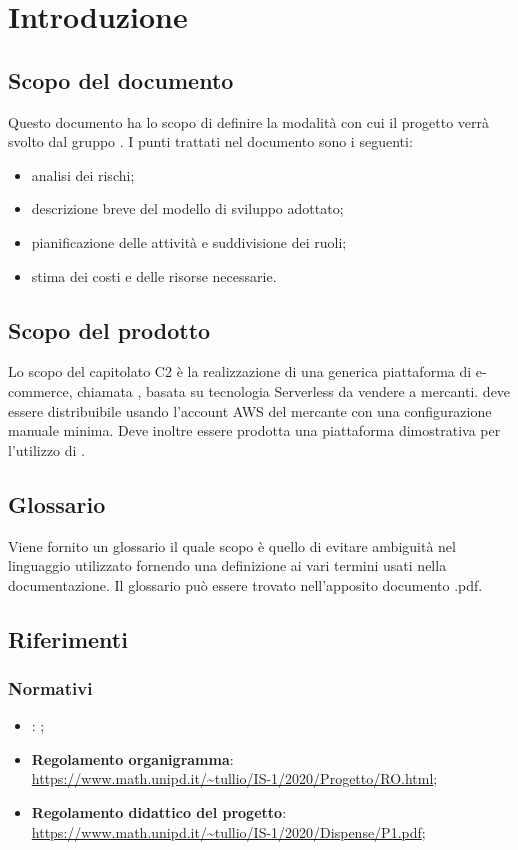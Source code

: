\section{Introduzione}
\subsection{Scopo del documento}
Questo documento ha lo scopo di definire la modalità con cui il progetto \nameproject{} verrà svolto dal gruppo \Omicron{}. I punti trattati nel documento sono i seguenti:
\begin{itemize}
\item analisi dei rischi;
\item descrizione breve del modello di sviluppo adottato;
\item pianificazione delle attività e suddivisione dei ruoli;
\item stima dei costi e delle risorse necessarie.
\end{itemize}
\subsection{Scopo del prodotto}
Lo scopo del capitolato C2 è la realizzazione di una generica piattaforma di e-commerce, chiamata \nameproject{}, basata su tecnologia Serverless da vendere a mercanti. \nameproject{} deve essere distribuibile usando l'account AWS del mercante con una configurazione manuale minima. Deve inoltre essere prodotta una piattaforma dimostrativa per l'utilizzo di \nameproject{}.
\subsection{Glossario}
Viene fornito un glossario il quale scopo è quello di evitare ambiguità nel linguaggio utilizzato fornendo una definizione ai vari termini usati nella documentazione. Il glossario può essere trovato nell'apposito documento \Glossario{}.pdf.
\subsection{Riferimenti}
\subsubsection{Normativi}
\begin{itemize}
\item \textbf{\NdP{}}: ;
\item \textbf{Regolamento organigramma}:\\ \url{https://www.math.unipd.it/~tullio/IS-1/2020/Progetto/RO.html};
\item \textbf{Regolamento didattico del progetto}:\\ \url{https://www.math.unipd.it/~tullio/IS-1/2020/Dispense/P1.pdf};
\end{itemize}

